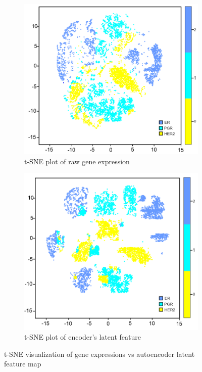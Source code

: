 \begin{figure}
	\centering
	\begin{subfigure}{.48\linewidth}
		\centering
		\includegraphics[scale=0.7]{images/raw_tsne.png}
		\caption{t-SNE plot of raw gene expression}
        \label{fig:tsne_raw}
	\end{subfigure}
	\begin{subfigure}{0.48\linewidth}
		\centering
		\includegraphics[scale=0.7]{images/ae_tsne.png}
		\caption{t-SNE plot of encoder's latent feature}
        \label{fig:tsne_ae}
	\end{subfigure}
	 \setlength{\belowcaptionskip}{-8pt}
	\caption{t-SNE visualization of gene expressions vs autoencoder latent feature map~\cite{karimACCESS2019}} 
	\label{fig:tnse}
\end{figure}

